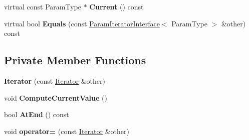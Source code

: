 \begin{DoxyCompactItemize}
\item 
\mbox{\label{classtesting_1_1internal_1_1_cartesian_product_generator3_1_1_iterator_ae080e9f15a69d31f49840a0e0ed5e4b4}} 
virtual const Param\+Type $\ast$ {\bfseries Current} () const
\item 
\mbox{\label{classtesting_1_1internal_1_1_cartesian_product_generator3_1_1_iterator_a0dd0b3d4b874e601cbc6aa3f55281a92}} 
virtual bool {\bfseries Equals} (const \mbox{\hyperlink{classtesting_1_1internal_1_1_param_iterator_interface}{Param\+Iterator\+Interface}}$<$ Param\+Type $>$ \&other) const
\end{DoxyCompactItemize}
\subsection*{Private Member Functions}
\begin{DoxyCompactItemize}
\item 
\mbox{\label{classtesting_1_1internal_1_1_cartesian_product_generator3_1_1_iterator_ae4f795aa9a1795600a25fbedfccedb1d}} 
{\bfseries Iterator} (const \mbox{\hyperlink{classtesting_1_1internal_1_1_cartesian_product_generator3_1_1_iterator}{Iterator}} \&other)
\item 
\mbox{\label{classtesting_1_1internal_1_1_cartesian_product_generator3_1_1_iterator_a4a285aaa75c086683484f3bd578b7105}} 
void {\bfseries Compute\+Current\+Value} ()
\item 
\mbox{\label{classtesting_1_1internal_1_1_cartesian_product_generator3_1_1_iterator_a1e037c2571ff507281c1ae99fea51659}} 
bool {\bfseries At\+End} () const
\item 
\mbox{\label{classtesting_1_1internal_1_1_cartesian_product_generator3_1_1_iterator_ad20c92a56e996d09e96e23eeeee7dd07}} 
void {\bfseries operator=} (const \mbox{\hyperlink{classtesting_1_1internal_1_1_cartesian_product_generator3_1_1_iterator}{Iterator}} \&other)
\end{DoxyCompactItemize}
